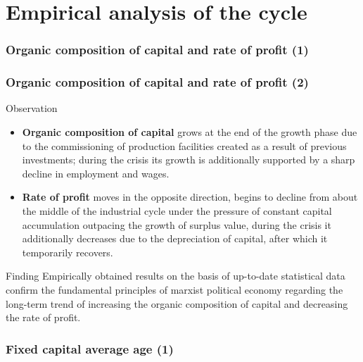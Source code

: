 \section{Empirical analysis of the cycle}

\begin{frame}[t]
  \frametitle{Organic composition of capital and rate of profit (1)}
  \begin{center}
  \end{center}
\end{frame}

\begin{frame}
  \frametitle{Organic composition of capital and rate of profit (2)}
  \begin{block}{Observation}
    \begin{itemize}
      \item \textbf{Organic composition of capital} grows at the end of the growth phase due to the commissioning of production facilities created as a result of previous investments; during the crisis its growth is additionally supported by a sharp decline in employment and wages.
      \item \textbf{Rate of profit} moves in the opposite direction, begins to decline from about the middle of the industrial cycle under the pressure of constant capital accumulation outpacing the growth of surplus value, during the crisis it additionally decreases due to the depreciation of capital, after which it temporarily recovers.
    \end{itemize}
  \end{block}

  \begin{alertblock}{Finding}
    Empirically obtained results on the basis of up-to-date statistical data confirm the fundamental principles of marxist political economy regarding the long-term trend of increasing the organic composition of capital and decreasing the rate of profit.
  \end{alertblock}
\end{frame}

\begin{frame}[t]
  \frametitle{Fixed capital average age (1)}
  \begin{center}
  \end{center}
\end{frame}

